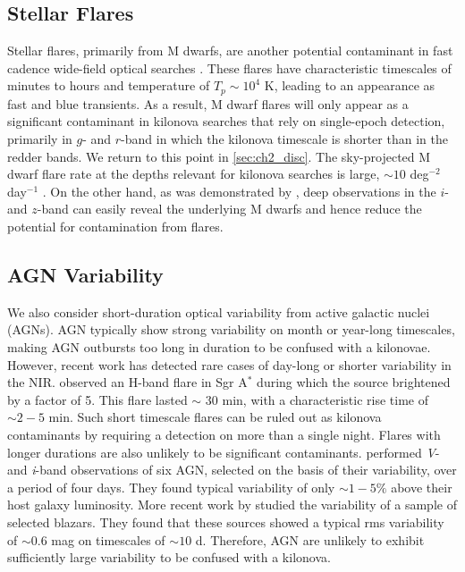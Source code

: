 \subsection{Stellar Flares}
\label{sec:ch2_flarestar}
Stellar flares, primarily from M dwarfs, are another potential contaminant in fast cadence wide-field optical searches \citep{Becker+04,KulkarniRau06,Berger+13}.  These flares have characteristic timescales of minutes to hours \citep[see e.g.,][]{Berger+13} and temperature of $T_p \sim 10^4$ K, leading to an appearance as fast and blue transients.  As a result, M dwarf flares will only appear as a significant contaminant in kilonova searches that rely on single-epoch detection, primarily in $g$- and $r$-band in which the kilonova timescale is shorter than in the redder bands.  We return to this point in \cref{sec:ch2_disc}.  The sky-projected M dwarf flare rate at the depths relevant for kilonova searches is large, $\sim 10$ deg$^{-2}$ day$^{-1}$ \citep{KulkarniRau06}.  On the other hand, as was demonstrated by \citet{Berger+13}, deep observations in the $i$- and $z$-band can easily reveal the underlying M dwarfs and hence reduce the potential for contamination from flares.

\subsection{AGN Variability}
\label{sec:ch2_agns}
We also consider short-duration optical variability from active galactic nuclei (AGNs). AGN typically show strong variability on month or year-long timescales, making AGN outbursts too long in duration to be confused with a kilonovae. However, recent work has detected rare cases of day-long  or shorter variability in the NIR. \citet{Genzel+03} observed an H-band flare in Sgr A$^{*}$ during which the source brightened by a factor of 5. This flare lasted $\sim$ 30 min, with a characteristic rise time of $\sim2-5$ min. Such short timescale flares can be ruled out as kilonova contaminants by requiring a detection on more than a single night. Flares with longer durations are also unlikely to be significant contaminants. \citet{Totani+05} performed {\em V}- and {\em i}-band observations of six AGN, selected on the basis of their variability, over a period of four days. They found typical variability of only $\sim1-5\%$ above their host galaxy luminosity. More recent work by \citet{Ruan+12} studied the variability of a sample of \fermi selected blazars. They found that these sources showed a typical rms variability of $\sim0.6$ mag on timescales of $\sim 10$ d. Therefore, AGN are unlikely to exhibit sufficiently large variability to be confused with a kilonova.

